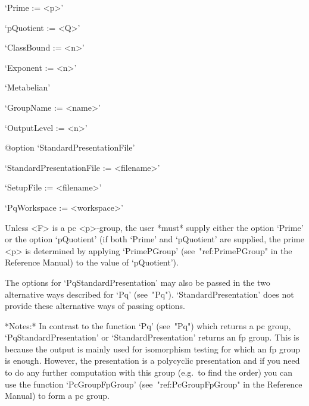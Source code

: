 \beginlist%

\item{}`Prime := <p>'

\item{}`pQuotient := <Q>'

\item{}`ClassBound := <n>'

\item{}`Exponent := <n>'

\item{}`Metabelian'

\item{}`GroupName := <name>'

\item{}`OutputLevel := <n>'

%
{@option \noexpand`StandardPresentationFile'}
\item{}`StandardPresentationFile := <filename>'

\item{}`SetupFile := <filename>'

\item{}`PqWorkspace := <workspace>'

\endlist

Unless <F> is a pc <p>-group, the user *must* supply  either  the  option
`Prime' or the option `pQuotient' (if both `Prime'  and  `pQuotient'  are
supplied,  the  prime  <p>  is  determined  by   applying   `PrimePGroup'
(see~"ref:PrimePGroup"  in  the  Reference  Manual)  to  the   value   of
`pQuotient').

The options for `PqStandardPresentation' may also be passed  in  the  two
alternative ways described for  `Pq'  (see~"Pq").  `StandardPresentation'
does not provide these alternative ways of passing options.

*Notes:*
In contrast  to the  function `Pq' (see~"Pq")  which returns a  pc group,
`PqStandardPresentation' or `StandardPresentation' returns an  fp  group.
This is because the output is mainly used  for  isomorphism  testing  for
which an fp group is enough. However, the presentation  is  a  polycyclic
presentation and if you need to do  any  further  computation  with  this
group (e.g.~to find the order) you can use the function  `PcGroupFpGroup'
(see~"ref:PcGroupFpGroup" in the {\GAP} Reference Manual) to  form  a  pc
group.

